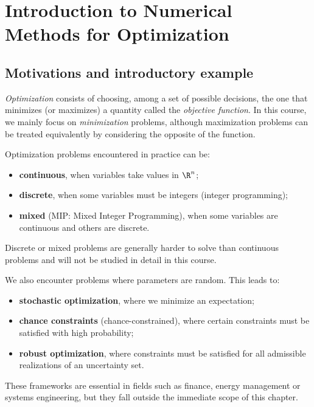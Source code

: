 \chapter{Introduction to Numerical Methods for Optimization}

\section{Motivations and introductory example}

\emph{Optimization} consists of choosing, among a set of possible decisions,
the one that minimizes (or maximizes) a quantity called the \emph{objective function}.
In this course, we mainly focus on \emph{minimization} problems, although
maximization problems can be treated equivalently by considering the opposite of the function.

\medskip

Optimization problems encountered in practice can be:

\begin{itemize}
  \item \textbf{continuous}, when variables take values in $\R^n$;
  \item \textbf{discrete}, when some variables must be integers
        (integer programming);
  \item \textbf{mixed} (MIP: Mixed Integer Programming), when some variables
        are continuous and others are discrete.
\end{itemize}

Discrete or mixed problems are generally harder to solve than continuous
problems and will not be studied in detail in this course.

\medskip

We also encounter problems where parameters are random. This leads to:

\begin{itemize}
  \item \textbf{stochastic optimization}, where we minimize an expectation;
  \item \textbf{chance constraints} (chance-constrained), where certain constraints must
        be satisfied with high probability;
  \item \textbf{robust optimization}, where constraints must be satisfied for all
        admissible realizations of an uncertainty set.
\end{itemize}

These frameworks are essential in fields such as finance, energy management
or systems engineering, but they fall outside the immediate scope of this chapter.

